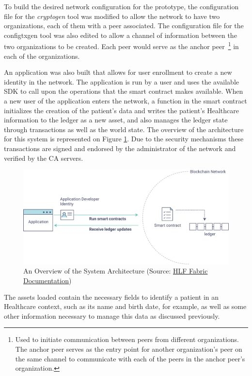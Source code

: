 To build the desired network configuration for the prototype, the configuration
file for the \textit{cryptogen} tool was modified to allow the network to have
two organizations, each of them with a peer associated. The configuration file
for the configtxgen tool was also edited to allow a channel of information
between the two organizations to be created. Each peer would serve as the
anchor peer~\footnote{Used to initiate communication between peers from
different organizations. The anchor peer serves as the entry point for another
organization’s peer on the same channel to communicate with each of the peers
in the anchor peer’s organization.} in each of the organizations.

An application was also built that allows for user enrollment to create a new
identity in the network. The application is run by a user and uses the
available SDK to call upon the operations that the smart contract makes
available. When a new user of the application enters the network, a function in
the smart contract initializes the creation of the patient's data and writes
the patient's Healthcare information to the ledger as a new asset, and also
manages the ledger state through transactions as well as the world state. The
overview of the architecture for this system is represented on Figure
\ref{fig:appOverview}. Due to the security mechanisms these transactions are
signed and endorsed by the administrator of the network and verified by the CA
servers.

\begin{figure}[ht] \centering
  \includegraphics[width=0.83\linewidth]{imgs/hyperledgerAppOverview.png}
  \caption{\label{fig:appOverview}An Overview of the System Architecture
  (Source:
  \href{http://hyperledger-fabric.readthedocs.io/en/latest/write_first_app.html}{HLF
  Fabric Documentation})} 
\end{figure}

The assets loaded contain the necessary fields to identify a patient in an
Healthcare context, such as its name and birth date, for example, as well as
some other information necessary to manage this data as discussed previously.

